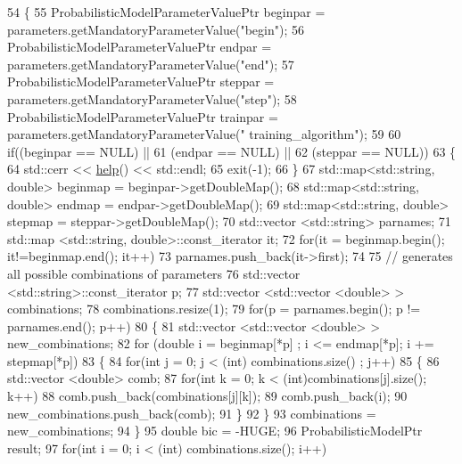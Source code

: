 \begin{DoxyCode}
54   \{
55     ProbabilisticModelParameterValuePtr beginpar = parameters.getMandatoryParameterValue(\textcolor{stringliteral}{"begin"});
56     ProbabilisticModelParameterValuePtr endpar = parameters.getMandatoryParameterValue(\textcolor{stringliteral}{"end"});
57     ProbabilisticModelParameterValuePtr steppar = parameters.getMandatoryParameterValue(\textcolor{stringliteral}{"step"});
58     ProbabilisticModelParameterValuePtr trainpar = parameters.getMandatoryParameterValue(\textcolor{stringliteral}{"
      training\_algorithm"});
59 
60     \textcolor{keywordflow}{if}((beginpar == NULL) ||
61        (endpar == NULL) ||
62        (steppar == NULL))
63       \{
64         std::cerr << \hyperlink{classtops_1_1BayesianInformationCriteria_ab420897d48ca999b1f8b236cef896b5b}{help}() << std::endl;
65         exit(-1);
66       \}
67     std::map<std::string, double> beginmap = beginpar->getDoubleMap();
68     std::map<std::string, double> endmap = endpar->getDoubleMap();
69     std::map<std::string, double> stepmap = steppar->getDoubleMap();
70     std::vector <std::string> parnames;
71     std::map <std::string, double>::const\_iterator it;
72     \textcolor{keywordflow}{for}(it = beginmap.begin(); it!=beginmap.end(); it++)
73       parnames.push\_back(it->first);
74 
75     \textcolor{comment}{// generates all possible combinations of parameters}
76     std::vector <std::string>::const\_iterator p;
77     std::vector <std::vector <double> > combinations;
78     combinations.resize(1);
79     \textcolor{keywordflow}{for}(p = parnames.begin(); p != parnames.end(); p++)
80       \{
81         std::vector <std::vector <double> > new\_combinations;
82         \textcolor{keywordflow}{for} (\textcolor{keywordtype}{double} i = beginmap[*p] ; i <= endmap[*p]; i += stepmap[*p])
83           \{
84             \textcolor{keywordflow}{for}(\textcolor{keywordtype}{int} j = 0; j < (int) combinations.size() ; j++)
85               \{
86                 std::vector <double> comb;
87                 \textcolor{keywordflow}{for}(\textcolor{keywordtype}{int} k = 0; k < (int)combinations[j].size(); k++)
88                   comb.push\_back(combinations[j][k]);
89                 comb.push\_back(i);
90                 new\_combinations.push\_back(comb);
91               \}
92           \}
93         combinations = new\_combinations;
94       \}
95     \textcolor{keywordtype}{double} bic = -HUGE;
96     ProbabilisticModelPtr result;
97     \textcolor{keywordflow}{for}(\textcolor{keywordtype}{int} i = 0; i < (int) combinations.size(); i++)

\end{DoxyCode}
